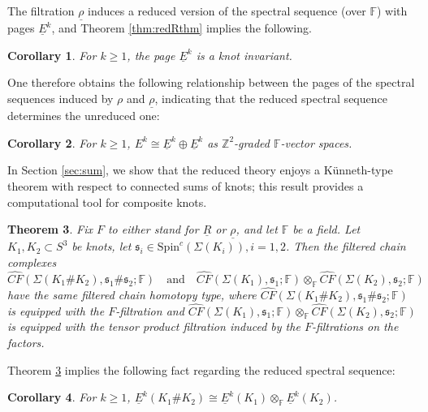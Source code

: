 \documentclass[11pt]{article}
\theoremstyle{plain} \newtheorem{thm}{Theorem}[subsection]
\theoremstyle{plain} \newtheorem{cor}[thm]{Corollary}
\theoremstyle{plain} \newtheorem{prop}[thm]{Proposition}
\theoremstyle{plain} \newtheorem{conj}[thm]{Conjecture}
\theoremstyle{plain} \newtheorem{lem}[thm]{Lemma}
\theoremstyle{definition} \newtheorem{df}[thm]{Definition}
\theoremstyle{remark} \newtheorem{rmk}[thm]{Remark}
\theoremstyle{remark} \newtheorem{obs}[thm]{Observation}
\newcommand{\DBC}[1]{\Sigma(#1)}
\newcommand{\red}[1]{\underline{#1}}
\numberwithin{equation}{section}
\begin{document}
The filtration $\red{\rho}$ induces a reduced version of the spectral sequence (over $\mathbb{F}$) with pages $\red{E}^{k}$, and Theorem \ref{thm:redRthm} implies the following.

\begin{cor}\label{cor:redRss}
For $k \geq 1$, the page $\red{E}^{k}$ is a knot invariant.
\end{cor}

One therefore obtains the following relationship between the pages of the spectral sequences induced by $\rho$ and $\red{\rho}$, indicating that the reduced spectral sequence determines the unreduced one:
\begin{cor}\label{cor:ss}
For $k \geq 1$, $E^{k} \cong \red{E}^{k} \oplus \red{E}^{k}$ as $\mathbb{Z}^2$-graded $\mathbb{F}$-vector spaces.
\end{cor}

In Section \ref{sec:sum}, we show that the reduced theory enjoys a K\"unneth-type theorem with respect to connected sums of knots; this result provides a computational tool for composite knots.

\begin{thm}\label{thm:sum}
Fix $F$ to either stand for $\red{R}$ or $\red{\rho}$, and let $\mathbb{F}$ be a field.  Let $K_{1}, K_{2} \subset S^{3}$ be knots, let $\mathfrak{s}_{i} \in \text{Spin}^{c}(\DBC{K_{i}}), i= 1, 2$.  Then the filtered chain complexes
\begin{equation*}
\widehat{CF}(\DBC{K_{1} \# K_{2}}, \mathfrak{s_{1}} \# \mathfrak{s_{2}}; \mathbb{F}) \quad \text{and} \quad 
	\widehat{CF}(\DBC{K_{1}}, \mathfrak{s_{1}}; \mathbb{F})
	\otimes_{\mathbb{F}}
	\widehat{CF}(\DBC{K_{2}}, \mathfrak{s_{2}};\mathbb{F})
\end{equation*}
have the same filtered chain homotopy type, where $\widehat{CF}(\DBC{K_{1} \# K_{2}}, \mathfrak{s_{1}} \# \mathfrak{s_{2}};\mathbb{F})$ is equipped with the $F$-filtration and $\widehat{CF}(\DBC{K_{1}}, \mathfrak{s_{1}};\mathbb{F}) \otimes_{\mathbb{F}} \widehat{CF}(\DBC{K_{2}}, \mathfrak{s_{2}};\mathbb{F})$ is equipped with the tensor product filtration induced by the $F$-filtrations on the factors.
\end{thm}

Theorem \ref{thm:sum} implies the following fact regarding the reduced spectral sequence:

\begin{cor}\label{cor:sssum}
For $k \geq 1$, $\red{E}^{k}(K_{1} \# K_{2}) \cong \red{E}^{k}(K_{1}) \otimes_{\mathbb{F}}\red{E}^{k}(K_{2})$.
\end{cor}
\end{document}
